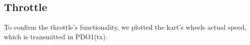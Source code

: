 \newpage

\subsection{Throttle}

To confirm the throttle's functionality, we plotted the kart's wheels actual speed, which is transmitted in PDO1(tx). 